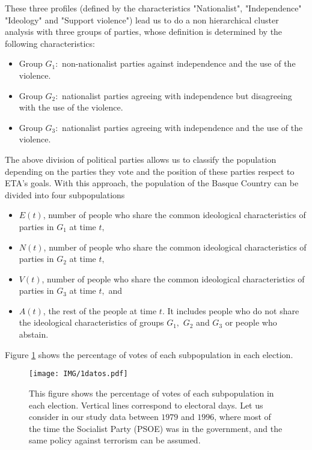 These three profiles (defined by the characteristics "Nationalist", "Independence" "Ideology" and "Support violence") lead us to do a non hierarchical cluster
analysis with three groups of parties, whose definition is determined by the
following characteristics:

\begin{itemize}
\item Group $G_{1}:$ non-nationalist parties against independence and the
use of the violence.
\item Group $G_{2}:$ nationalist parties agreeing with independence but
disagreeing with the use of the violence.
\item Group $G_{3}:$ nationalist parties agreeing with independence and the use
of the violence.
\end{itemize}

The above division of political parties allows us to classify the population depending on the parties they vote and the position of these parties respect to ETA's goals. With this approach, the population of the Basque Country can be divided into four subpopulations

\begin{itemize}
\item $E(t)$, number of people who share the common ideological
characteristics of parties in $G_{1}$ at time $t,$
\item $N(t)$, number of people who share the common ideological
characteristics of parties in $G_{2}$ at time $t,$
\item $V(t)$, number of people who share the common ideological
characteristics of parties in $G_{3}$ at time $t,$ and
\item $A(t)$, the rest of the people at time $t$. It includes
people who do not share the ideological characteristics of groups $G_{1},$ 
$G_{2}$ and $G_{3}$ or people who abstain.
\end{itemize}

Figure \ref{1graf1} shows the percentage of votes of each subpopulation in
each election. 

\begin{figure}[htb]
\begin{center}
\texttt{[image: IMG/1datos.pdf]}
\end{center}
\caption{This figure shows the percentage of votes of each subpopulation 
in each election. Vertical lines correspond to electoral days. Let us 
consider in our study data between $1979$ and $1996$, where most of the  
time the Socialist Party (PSOE) was in the government, and the same policy against terrorism can 
be assumed.}
\label{1graf1}
\end{figure}

